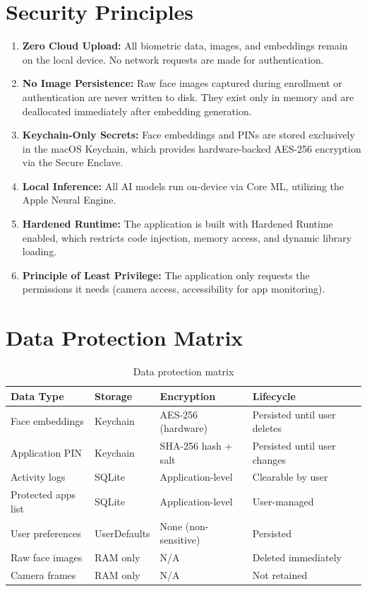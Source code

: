 \documentclass[12pt,a4paper]{report}
\begin{document}
\section{Security Principles}
\begin{enumerate}
    \item \textbf{Zero Cloud Upload:} All biometric data, images, and embeddings remain on the local device. No network requests are made for authentication.
    \item \textbf{No Image Persistence:} Raw face images captured during enrollment or authentication are never written to disk. They exist only in memory and are deallocated immediately after embedding generation.
    \item \textbf{Keychain-Only Secrets:} Face embeddings and PINs are stored exclusively in the macOS Keychain, which provides hardware-backed AES-256 encryption via the Secure Enclave.
    \item \textbf{Local Inference:} All AI models run on-device via Core ML, utilizing the Apple Neural Engine.
    \item \textbf{Hardened Runtime:} The application is built with Hardened Runtime enabled, which restricts code injection, memory access, and dynamic library loading.
    \item \textbf{Principle of Least Privilege:} The application only requests the permissions it needs (camera access, accessibility for app monitoring).
\end{enumerate}

\section{Data Protection Matrix}
\begin{table}[H]
\centering
\begin{tabularx}{\textwidth}{lllX}
\toprule
\textbf{Data Type} & \textbf{Storage} & \textbf{Encryption} & \textbf{Lifecycle} \\
\midrule
Face embeddings & Keychain & AES-256 (hardware) & Persisted until user deletes \\
Application PIN & Keychain & SHA-256 hash + salt & Persisted until user changes \\
Activity logs & SQLite & Application-level & Clearable by user \\
Protected apps list & SQLite & Application-level & User-managed \\
User preferences & UserDefaults & None (non-sensitive) & Persisted \\
Raw face images & RAM only & N/A & Deleted immediately \\
Camera frames & RAM only & N/A & Not retained \\
\bottomrule
\end{tabularx}
\caption{Data protection matrix}
\end{table}
\end{document}
